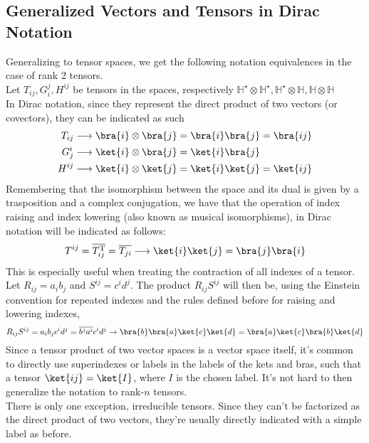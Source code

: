 \documentclass[a4paper, 11pt]{book}
\newcommand{\1}{\opr{\mathds{1}}}
\theoremstyle{plain}
\begin{document}
	\subsection{Generalized Vectors and Tensors in Dirac Notation}
	Generalizing to tensor spaces, we get the following notation equivalences in the case of rank 2 tensors.\\
	Let $T_{ij},G_{i}^{j},H^{ij}$ be tensors in the spaces, respectively $\mathbb{H}^{\star}\otimes\mathbb{H}^{\star},\mathbb{H}^{\star}\otimes\mathbb{H},\mathbb{H}\otimes\mathbb{H}$\\
	In Dirac notation, since they represent the direct product of two vectors (or covectors), they can be indicated as such
	\begin{equation}
		\begin{aligned}
			T_{ij}&\longrightarrow\bra{i}\otimes\bra{j}=\bra{i}\bra{j}=\bra{ij}\\
			G^i_j&\longrightarrow\ket{i}\otimes\bra{j}=\ket{i}\bra{j}\\
			H^{ij}&\longrightarrow\ket{i}\otimes\ket{j}=\ket{i}\ket{j}=\ket{ij}
		\end{aligned}
		\label{eq:tensorsdiracnot}
	\end{equation}
	Remembering that the isomorphism between the space and its dual is given by a trasposition and a complex conjugation, we have that the operation of index raising and index lowering (also known as musical isomorphisms), in Dirac notation will be indicated as follows:
	\begin{equation}
		T^{ij}=\overline{T_{ij}^{\text{T}}}=\overline{T_{ji}}\longrightarrow\ket{i}\ket{j}=\bra{j}\bra{i}
		\label{eq:musicalisomorphism}
	\end{equation}
	This is especially useful when treating the contraction of all indexes of a tensor.\\
	Let $R_{ij}=a_ib_j$ and $S^{ij}=c^id^j$. The product $R_{ij}S^{ij}$ will then be, using the Einstein convention for repeated indexes and the rules defined before for raising and lowering indexes,
	\begin{equation}
		R_{ij}S^{ij}=a_ib_jc^id^j=\overline{b^ja^i}c^id^j\to\bra{b}\bra{a}\ket{c}\ket{d}=\bra{a}\ket{c}\bra{b}\ket{d}
		\label{eq:doublescalarprod}
	\end{equation}
	Since a tensor product of two vector spaces is a vector space itself, it's common to directly use superindexes or labels in the labels of the kets and bras, such that a tensor $\ket{ij}=\ket{I}$, where $I$ is the chosen label. It's not hard to then generalize the notation to rank-$n$ tensors.\\
	There is only one exception, irreducible tensors. Since they can't be factorized as the direct product of two vectors, they're usually directly indicated with a simple label as before.\\
\end{document}
